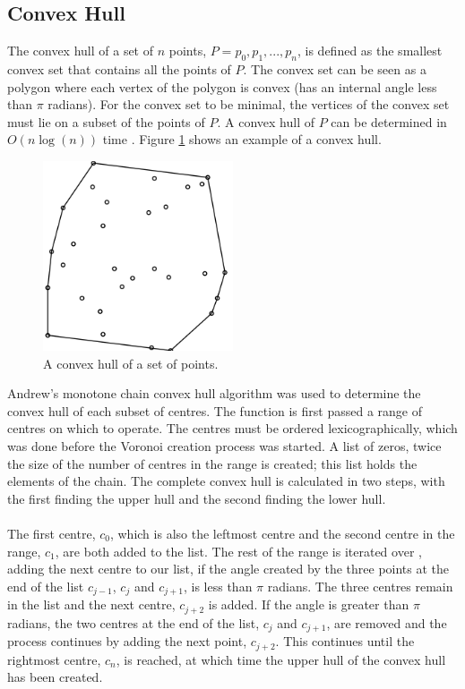 \subsection{Convex Hull}
The convex hull of a set of $n$ points, $P = {p_0,p_1,...,p_n}$, is defined as the smallest convex set that contains all the points of $P$. The convex set can be seen as a polygon where each vertex of the polygon is convex (has an internal angle less than $\pi$ radians). For the convex set to be minimal, the vertices of the convex set must lie on a subset of the points of $P$. A convex hull of $P$ can be determined in $O(n\log(n))$ time \citep{eddy1977new}. Figure \ref{fig:convexhull} shows an example of a convex hull.
\begin{figure}[H]
\centering
\includegraphics[width=0.5\textwidth]{Images/convexhull.png}
\caption[]{A convex hull of a set of points\footnotemark.}
\label{fig:convexhull}
\end{figure}
Andrew's monotone chain convex hull algorithm \citep{andrew1979another} was used to determine the convex hull of each subset of centres. The function is first passed a range of centres on which to operate. The centres must be ordered lexicographically, which was done before the Voronoi creation process was started. A list of zeros, twice the size of the number of centres in the range is created; this list holds the elements of the chain. The complete convex hull is calculated in two steps, with the first finding the upper hull and the second finding the lower hull.
\\
\\
The first centre, $c_0$, which is also the leftmost centre and the second centre in the range, $c_1$, are both added to the list. The rest of the range is iterated over , adding the next centre to our list, if the angle created by the three points at the end of the list $c_{j-1}$, $c_j$ and $c_{j+1}$, is less than $\pi$ radians. The three centres remain in the list and the next centre, $c_{j+2}$ is added. If the angle is greater than $\pi$ radians, the two centres at the end of the list, $c_j$ and $c_{j+1}$, are removed and the process continues by adding the next point, $c_{j+2}$. This continues until the rightmost centre, $c_n$, is reached, at which time the upper hull of the convex hull has been created.
